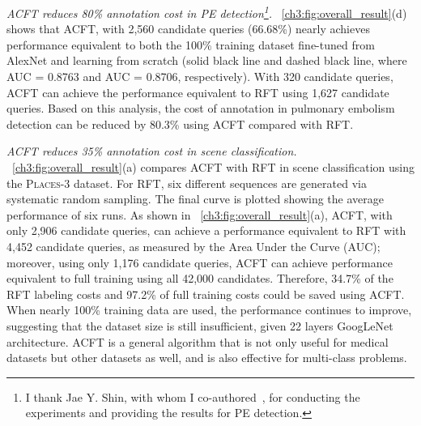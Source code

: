\textit{ACFT reduces 80\% annotation cost in PE detection\footnote{I thank Jae Y. Shin, with whom I co-authored~\citet{zhou2017fine,zhou2021active}, for conducting the experiments and providing the results for PE detection.}.} \figurename~\ref{ch3:fig:overall_result}(d) shows that ACFT, with 2,560 candidate queries (66.68\%) nearly achieves performance equivalent to both the 100\% training dataset fine-tuned from AlexNet and learning from scratch (solid black line and dashed black line, where AUC = 0.8763 and AUC = 0.8706, respectively). With 320 candidate queries, ACFT can achieve the performance equivalent to RFT using 1,627 candidate queries. Based on this analysis, the cost of annotation in pulmonary embolism detection can be reduced by 80.3\% using ACFT compared with RFT.




\textit{ACFT reduces 35\% annotation cost in scene classification.} \figurename~\ref{ch3:fig:overall_result}(a) compares ACFT with RFT in scene classification using the \textsc{Places-3} dataset. For RFT, six different sequences are generated via systematic random sampling. The final curve is plotted showing the average performance of six runs. As shown in \figurename~\ref{ch3:fig:overall_result}(a), ACFT, with only 2,906 candidate queries, can achieve a performance equivalent to RFT with 4,452 candidate queries, as measured by the Area Under the Curve (AUC); moreover, using only 1,176 candidate queries, ACFT can achieve performance equivalent to full training using all 42,000 candidates. Therefore, 34.7\% of the RFT labeling costs and 97.2\% of full training costs could be saved using ACFT. When nearly 100\% training data are used, the performance continues to improve, suggesting that the dataset size is still insufficient, given 22 layers GoogLeNet architecture. ACFT is a general algorithm that is not only useful for medical datasets but other datasets as well, and is also effective for multi-class problems.


